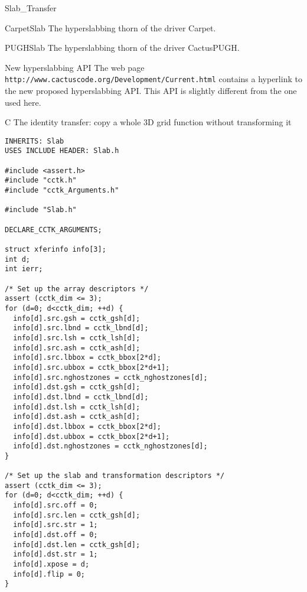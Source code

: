 \begin{FunctionDescription}{Slab\_Transfer}{}
\begin{SeeAlsoSection}
\begin{SeeAlso}{CarpetSlab}
The hyperslabbing thorn of the driver Carpet.
\end{SeeAlso}

\begin{SeeAlso}{PUGHSlab}
The hyperslabbing thorn of the driver CactusPUGH.
\end{SeeAlso}

\begin{SeeAlso}{New hyperslabbing API}
The web page
\texttt{http://www.cactuscode.org/Development/Current.html} contains a
hyperlink to the new proposed hyperslabbing API\@.  This API is slightly
different from the one used here.
\end{SeeAlso}
\end{SeeAlsoSection}

\begin{ExampleSection}
\begin{Example}{C}
The identity transfer: copy a whole 3D grid function without
transforming it

\begin{verbatim}
INHERITS: Slab
USES INCLUDE HEADER: Slab.h

#include <assert.h>
#include "cctk.h"
#include "cctk_Arguments.h"

#include "Slab.h"

DECLARE_CCTK_ARGUMENTS;

struct xferinfo info[3];
int d;
int ierr;

/* Set up the array descriptors */
assert (cctk_dim <= 3);
for (d=0; d<cctk_dim; ++d) {
  info[d].src.gsh = cctk_gsh[d];
  info[d].src.lbnd = cctk_lbnd[d];
  info[d].src.lsh = cctk_lsh[d];
  info[d].src.ash = cctk_ash[d];
  info[d].src.lbbox = cctk_bbox[2*d];
  info[d].src.ubbox = cctk_bbox[2*d+1];
  info[d].src.nghostzones = cctk_nghostzones[d];
  info[d].dst.gsh = cctk_gsh[d];
  info[d].dst.lbnd = cctk_lbnd[d];
  info[d].dst.lsh = cctk_lsh[d];
  info[d].dst.ash = cctk_ash[d];
  info[d].dst.lbbox = cctk_bbox[2*d];
  info[d].dst.ubbox = cctk_bbox[2*d+1];
  info[d].dst.nghostzones = cctk_nghostzones[d];
}

/* Set up the slab and transformation descriptors */
assert (cctk_dim <= 3);
for (d=0; d<cctk_dim; ++d) {
  info[d].src.off = 0;
  info[d].src.len = cctk_gsh[d];
  info[d].src.str = 1;
  info[d].dst.off = 0;
  info[d].dst.len = cctk_gsh[d];
  info[d].dst.str = 1;
  info[d].xpose = d;
  info[d].flip = 0;
}


\end{verbatim}
\end{Example}
\end{ExampleSection}
\end{FunctionDescription}
